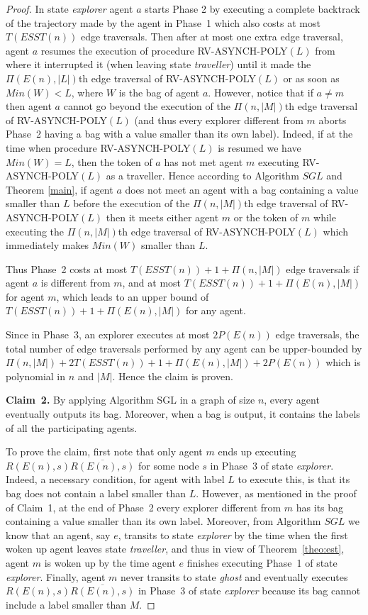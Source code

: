 \documentclass [11pt] {article}
\begin{document}
\begin{proof}
{In state {\em explorer} agent $a$ starts Phase 2 by executing a complete backtrack of the trajectory made by the agent in Phase~1 which also costs at most 
{$T(ESST(n))$} edge traversals. Then after at most one extra edge traversal, agent $a$ resumes the execution of procedure RV-ASYNCH-POLY$(L)$ from where it interrupted it (when leaving state {\em traveller}) until it made the $\Pi(E(n),|L|)$th edge traversal of RV-ASYNCH-POLY$(L)$ or as soon as $Min(W)<L$, where $W$ is the bag of agent $a$. However, notice that if $a\ne m$ then agent $a$ cannot go beyond the execution of the $\Pi(n,|M|)$th edge traversal of RV-ASYNCH-POLY$(L)$ (and thus every explorer different from $m$ aborts Phase~2 having a bag with a value smaller than its own label). Indeed, if at the time when procedure RV-ASYNCH-POLY$(L)$ is resumed we  have $Min(W)=L$, then the token of $a$ has not met agent $m$ executing RV-ASYNCH-POLY$(L)$ as a traveller. Hence according to Algorithm $SGL$ and Theorem \ref{main}, if agent $a$ does not meet an agent with a bag containing a value smaller than $L$ before the execution of the $\Pi(n,|M|)$th edge traversal of RV-ASYNCH-POLY$(L)$ then it meets either agent $m$ or the token of $m$ while executing the $\Pi(n,|M|)$th edge traversal of 
RV-ASYNCH-POLY$(L)$ which immediately makes $Min(W)$ smaller than $L$.}

{Thus Phase~2 costs at most {$T(ESST(n))+1+\Pi(n,|M|)$} edge traversals if agent $a$ is different from $m$, and at most {$T(ESST(n))+1+\Pi(E(n),|M|)$} for agent $m$, which leads to an upper bound of {$T(ESST(n))+1+\Pi(E(n),|M|)$ for any agent}.}

{Since in Phase~3, an explorer executes at most $2P(E(n))$ edge traversals, the total number of edge traversals performed by any agent can be upper-bounded by  {$\Pi(n,|M|)+2T(ESST(n))+1+\Pi(E(n),|M|)+2P(E(n))$} which is polynomial in $n$ and $|M|$. Hence the claim is proven.}

\vspace*{0.3cm}

\noindent
{{\bf Claim~2.} By applying Algorithm SGL in a graph of size $n$, every agent eventually outputs its bag. Moreover, when a bag is output, it contains the labels of all the participating agents.}

{To prove the claim, first note that only agent $m$ ends up executing $R(E(n),s)\overline{R(E(n),s)}$ for some node $s$ in Phase~3 of state {\em explorer}. Indeed, a necessary condition, for agent with label $L$ to execute this, is that its bag does not contain a label smaller than $L$. However, as mentioned in the proof of Claim~1, at the end of Phase~2 every explorer different from $m$ has its bag containing a value smaller than its own label. Moreover, from Algorithm $SGL$ we know that an agent, say $e$, transits to state {\em explorer} by the time when the first woken up agent leaves state {\em traveller}, and thus in view of Theorem~\ref{theo:est}, agent $m$ is woken up by the time agent $e$ finishes executing Phase~1 of state {\em explorer}. Finally, agent $m$ never transits to state {\em ghost} and eventually executes $R(E(n),s)\overline{R(E(n),s)}$ in Phase~3 of state {\em explorer} because its bag cannot include a label smaller than $M$.}


\end{proof}
\end{document}
